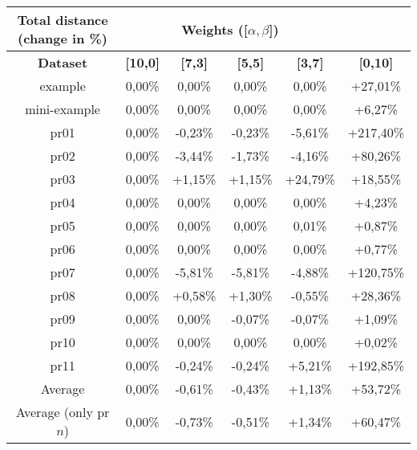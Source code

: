 {
\renewcommand{\arraystretch}{2}
\begin{longtable}[h]{| c | c | c | c | c | c |}
    \hline
    \textbf{Total distance (change in \%)} & \multicolumn{4}{c}{\textbf{Weights ([$\alpha,\beta$])}} & \\
    \hline
    \textbf{Dataset} & \textbf{[10,0]} & \textbf{[7,3]} & \textbf{[5,5]} & \textbf{[3,7]} & \textbf{[0,10]} \\
    \hline
    \endhead
    example              & 0,00\% &  0,00\% &  0,00\% &   0,00\% &  +27,01\% \\
    \hline
    mini-example         & 0,00\% &  0,00\% &  0,00\% &   0,00\% &   +6,27\% \\
    \hline
    pr01                 & 0,00\% & -0,23\% & -0,23\% &  -5,61\% & +217,40\% \\
    \hline
    pr02                 & 0,00\% & -3,44\% & -1,73\% &  -4,16\% &  +80,26\% \\
    \hline
    pr03                 & 0,00\% & +1,15\% & +1,15\% & +24,79\% &  +18,55\% \\
    \hline
    pr04                 & 0,00\% &  0,00\% &  0,00\% &   0,00\% &   +4,23\% \\
    \hline
    pr05                 & 0,00\% &  0,00\% &  0,00\% &   0,01\% &   +0,87\% \\
    \hline
    pr06                 & 0,00\% &  0,00\% &  0,00\% &   0,00\% &   +0,77\% \\
    \hline
    pr07                 & 0,00\% & -5,81\% & -5,81\% &  -4,88\% & +120,75\% \\
    \hline
    pr08                 & 0,00\% & +0,58\% & +1,30\% &  -0,55\% &  +28,36\% \\
    \hline
    pr09                 & 0,00\% &  0,00\% & -0,07\% &  -0,07\% &   +1,09\% \\
    \hline
    pr10                 & 0,00\% &  0,00\% &  0,00\% &   0,00\% &   +0,02\% \\
    \hline
    pr11                 & 0,00\% & -0,24\% & -0,24\% &  +5,21\% & +192,85\% \\
    \hline
    Average              & 0,00\% & -0,61\% & -0,43\% &  +1,13\% &  +53,72\% \\
    \hline
    Average (only pr$n$) & 0,00\% & -0,73\% & -0,51\% &  +1,34\% &  +60,47\% \\
\end{longtable}
}

